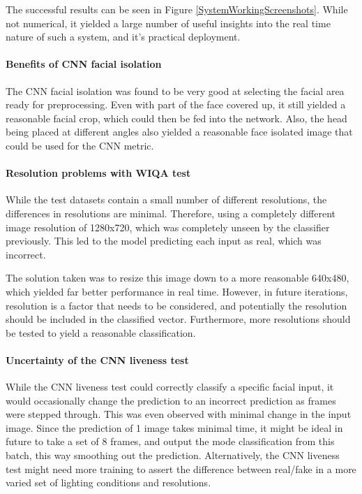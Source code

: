 \documentclass[10pt,a4paper]{article}
\begin{document}
        The successful results can be seen in Figure \ref{SystemWorkingScreenshots}. While not numerical, it yielded a large number of useful insights into the real time nature of such a system,
        and it's practical deployment.

        \paragraph{Benefits of CNN facial isolation}
        The CNN facial isolation was found to be very good at selecting the facial area ready for preprocessing. Even with part of the face covered up, it still yielded a reasonable
        facial crop, which could then be fed into the network. Also, the head being placed at different angles also yielded a reasonable face isolated image that could be used for the
        CNN metric.
    
        \paragraph{Resolution problems with WIQA test}
            While the test datasets contain a small number of different resolutions, the differences in resolutions are minimal. Therefore, using a completely different image resolution
            of 1280x720, which was completely unseen by the classifier previously. This led to the model predicting each input as real, which was incorrect.

            The solution taken was to resize this image down to a more reasonable 640x480, which yielded far better performance in real time. However, in future iterations, resolution is
            a factor that needs to be considered, and potentially the resolution should be included in the classified vector. Furthermore, more resolutions should be tested to yield a reasonable
            classification.

        \paragraph{Uncertainty of the CNN liveness test}
            While the CNN liveness test could correctly classify a specific facial input, it would occasionally change the prediction to an incorrect prediction
            as frames were stepped through. This was even observed with minimal change in the input image. Since the prediction of 1 image takes minimal time,
            it might be ideal in future to take a set of 8 frames, and output the mode classification from this batch, this way smoothing out the prediction.
            Alternatively, the CNN liveness test might need more training to assert the difference between real/fake in a more varied set of lighting conditions and resolutions.
\end{document}
